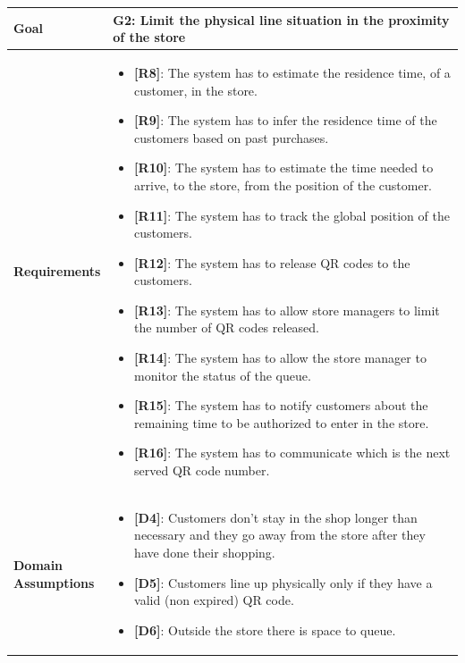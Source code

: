 \begin{table}[H]
\centering
\begin{tabular}{| m{} | m{} |} 
	\hline
	\textbf{Goal} &
		\textbf{G2: Limit the physical line situation in the proximity of the store} \\
	\hline
	\textbf{Requirements} &
		\begin{itemize}
			\item {\textbf{[R8]}}: The system has to estimate the residence time, of a customer, in the store.
			\item {\textbf{[R9]}}: The system has to infer the residence time of the customers based on past purchases.
			\item {\textbf{[R10]}}: The system has to estimate the time needed to arrive, to the store, from the position of the customer.
			\item {\textbf{[R11]}}: The system has to track the global position of the customers.
			\item {\textbf{[R12]}}: The system has to release QR codes to the customers.
			\item {\textbf{[R13]}}: The system has to allow store managers to limit the number of QR codes released.
			\item {\textbf{[R14]}}: The system has to allow the store manager to monitor the status of the queue.
			\item {\textbf{[R15]}}: The system has to notify customers about the remaining time to be authorized to enter in the store.
			\item {\textbf{[R16]}}: The system has to communicate which is the next served QR code number.
		\end{itemize} \\ 
	\hline
	\shortstack[l]{\textbf{Domain} \\ \textbf{Assumptions}} & 
		\begin{itemize}
			\item {\textbf{[D4]}}: Customers don't stay in the shop longer than necessary and they go away from the store after they have done their shopping.
			\item {\textbf{[D5]}}: Customers line up physically only if they have a valid (non expired) QR code.
			\item {\textbf{[D6]}}: Outside the store there is space to queue.
		\end{itemize} \\ 
	\hline
\end{tabular}
\end{table}


